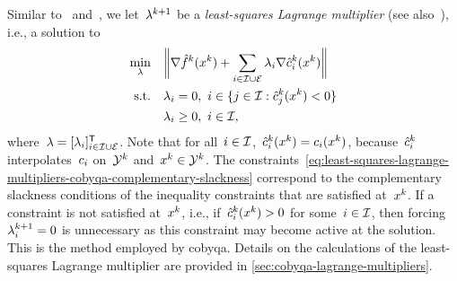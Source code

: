 Similar to~\cite[\S~15.2, p.~626]{Conn_Gould_Toint_2000} and~\cite[Eq.~(18.22)]{Nocedal_Wright_2006}, we let~$\lm[k + 1]$ be a \emph{least-squares Lagrange multiplier} (see also~\cite[\S~3.3]{Dussault_1995}), i.e., a solution to
\begin{subequations}
    \label{eq:least-squares-lagrange-multipliers-cobyqa}
    \begin{align}
        \min_{\lm}  & \quad \norm[\bigg]{\nabla \objm[k](\iter[k]) + \sum_{i \in \iub \cup \ieq} \lm_i \nabla \conm[k]{i}(\iter[k])}\\
        \text{s.t.} & \quad \lm_i = 0, ~ i \in \set{j \in \iub : \conm[k]{j}(\iter[k]) < 0} \label{eq:least-squares-lagrange-multipliers-cobyqa-complementary-slackness}\\
                    & \quad \lm_i \ge 0, ~ i \in \iub,
    \end{align}
\end{subequations}
where~$\lm = [\lm_i]_{i \in \iub \cup \ieq}^{\T}$.
Note that for all~$i \in \mathcal{I}$,~$\conm[k]{i}(\iter[k]) = \con{i}(\iter[k])$, because~$\conm[k]{i}$ interpolates~$c_{i}$ on~$\xpt[k]$ and~$\iter[k] \in \xpt[k]$.
The constraints~\cref{eq:least-squares-lagrange-multipliers-cobyqa-complementary-slackness} correspond to the complementary slackness conditions of the inequality constraints that are satisfied at~$\iter[k]$.
If a constraint is not satisfied at~$\iter[k]$, i.e., if~$\conm[k]{i}(\iter[k]) > 0$ for some~$i \in \mathcal{I}$, then forcing~$\lm_i^{k + 1} = 0$ is unnecessary as this constraint may become active at the solution.
This is the method employed by \gls{cobyqa}.
Details on the calculations of the least-squares Lagrange multiplier are provided in \cref{sec:cobyqa-lagrange-multipliers}.

